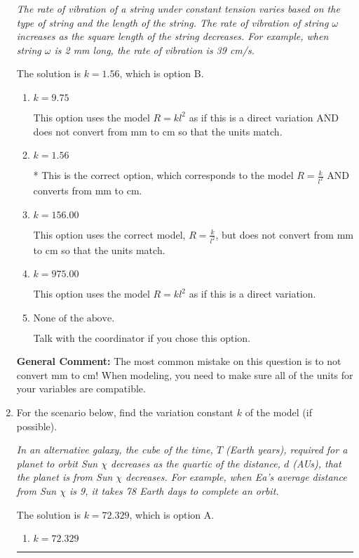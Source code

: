 \documentclass{extbook}[14pt]
\newcommand{\litem}[1]{\item #1

\rule{\textwidth}{0.4pt}}
\begin{document}
\begin{enumerate}
{\begin{center}
    \textit{ The rate of vibration of a string under constant tension varies based on the type of string and the length of the string. The rate of vibration of string $\omega$ increases as the square length of the string decreases. For example, when string $\omega$ is 2 mm long, the rate of vibration is 39 cm/s. }
\end{center}
The solution is \( k = 1.56 \), which is option B.\begin{enumerate}[label=\Alph*.]
\item \( k = 9.75 \)

This option uses the model $R = kl^{2}$ as if this is a direct variation AND does not convert from mm to cm so that the units match.
\item \( k = 1.56 \)

* This is the correct option, which corresponds to the model $R = \frac{k}{l^{2}}$ AND converts from mm to cm.
\item \( k = 156.00 \)

This option uses the correct model, $R = \frac{k}{l^{2}}$, but does not convert from mm to cm so that the units match.
\item \( k = 975.00 \)

This option uses the model $R = kl^{2}$ as if this is a direct variation.
\item \( \text{None of the above.} \)

Talk with the coordinator if you chose this option.
\end{enumerate}

\textbf{General Comment:} The most common mistake on this question is to not convert mm to cm! When modeling, you need to make sure all of the units for your variables are compatible.
}
\litem{
For the scenario below, find the variation constant $k$ of the model (if possible).

\begin{center}
    \textit{ In an alternative galaxy, the cube of the time, $T$ (Earth years), required for a planet to orbit Sun $\chi$ decreases as the quartic of the distance, $d$ (AUs), that the planet is from Sun $\chi$ decreases. For example, when Ea's average distance from Sun $\chi$ is 9, it takes 78 Earth days to complete an orbit. }
\end{center}
The solution is \( k = 72.329 \), which is option A.\begin{enumerate}[label=\Alph*.]
\item \( k = 72.329 \)


\end{enumerate}}
\end{enumerate}
\end{document}
